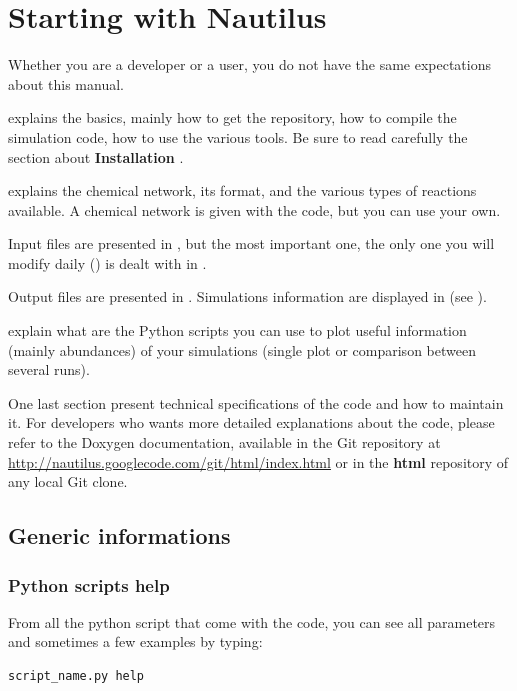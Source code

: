 \documentclass[english,a4paper,twoside]{article}
\begin{document}
\section{Starting with Nautilus}\label{sec:starting}
Whether you are a developer or a user, you do not have the same expectations about this manual. 

 explains the basics, mainly how to get the repository, how to compile the simulation code, how to use the various tools. Be sure to read carefully the section about \textbf{Installation} .

 explains the chemical network, its format, and the various types of reactions available. A chemical network is given with the code, but you can use your own. 

Input files are presented in , but the most important one, the only one you will modify daily () is dealt with in .

Output files are presented in . Simulations information are displayed in  (see ).

 explain what are the Python scripts you can use to plot useful information (mainly abundances) of your simulations (single plot or comparison between several runs).

One last section  present technical specifications of the code and how to maintain it. For developers who wants more detailed explanations about the code, please refer to the Doxygen documentation, available in the Git repository at \url{http://nautilus.googlecode.com/git/html/index.html} or in the \textbf{html} repository of any local Git clone.

\subsection{Generic informations}
\subsubsection{Python scripts help}\label{sec:python-help}
From all the python script that come with the code, you can see all parameters and sometimes a few examples by typing:
\begin{verbatim}
script_name.py help
\end{verbatim}
\end{document}
